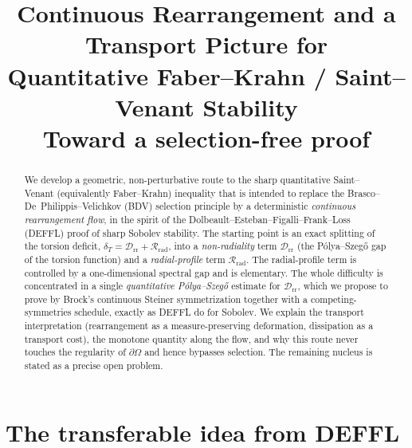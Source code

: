 \documentclass[11pt]{article}
\title{Continuous Rearrangement and a Transport Picture for\\
       Quantitative Faber--Krahn / Saint--Venant Stability\\
       \large Toward a selection-free proof}
\author{}
\date{}
\theoremstyle{definition}
\newcommand{\Om}{\Omega}
\newcommand{\Drr}{\mathcal D_{\mathrm{rr}}}
\newcommand{\Rrad}{\mathcal R_{\mathrm{rad}}}
\newcommand{\dT}{\delta_T}
\begin{document}
\maketitle

\begin{abstract}
We develop a geometric, non-perturbative route to the sharp quantitative
Saint--Venant (equivalently Faber--Krahn) inequality that is intended to
replace the Brasco--De~Philippis--Velichkov (BDV) selection principle by a
deterministic \emph{continuous rearrangement flow}, in the spirit of the
Dolbeault--Esteban--Figalli--Frank--Loss (DEFFL) proof of sharp Sobolev
stability. The starting point is an exact splitting of the torsion deficit,
$\dT=\Drr+\Rrad$, into a \emph{non-radiality} term $\Drr$ (the Pólya--Szegő
gap of the torsion function) and a \emph{radial-profile} term $\Rrad$. The
radial-profile term is controlled by a one-dimensional spectral gap and is
elementary. The whole difficulty is concentrated in a single
\emph{quantitative Pólya--Szegő} estimate for $\Drr$, which we propose to
prove by Brock's continuous Steiner symmetrization together with a
competing-symmetries schedule, exactly as DEFFL do for Sobolev. We explain
the transport interpretation (rearrangement as a measure-preserving
deformation, dissipation as a transport cost), the monotone quantity along
the flow, and why this route never touches the regularity of $\partial\Om$
and hence bypasses selection. The remaining nucleus is stated as a precise
open problem.
\end{abstract}

\tableofcontents

\section{The transferable idea from DEFFL}
\end{document}
